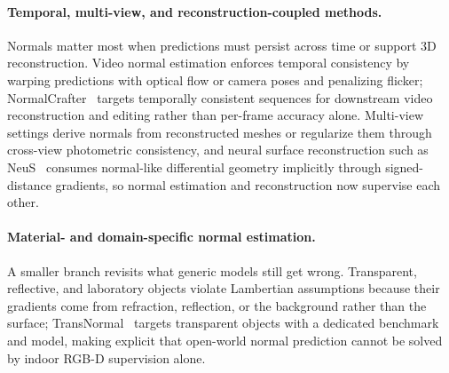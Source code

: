 \paragraph{Temporal, multi-view, and reconstruction-coupled methods.}
Normals matter most when predictions must persist across time or support 3D reconstruction.
Video normal estimation enforces temporal consistency by warping predictions with optical flow or camera poses and penalizing flicker; NormalCrafter~\cite{wang2025normalcrafter} targets temporally consistent sequences for downstream video reconstruction and editing rather than per-frame accuracy alone.
Multi-view settings derive normals from reconstructed meshes or regularize them through cross-view photometric consistency, and neural surface reconstruction such as NeuS~\cite{wang2021neus} consumes normal-like differential geometry implicitly through signed-distance gradients, so normal estimation and reconstruction now supervise each other.

\paragraph{Material- and domain-specific normal estimation.}
A smaller branch revisits what generic models still get wrong.
Transparent, reflective, and laboratory objects violate Lambertian assumptions because their gradients come from refraction, reflection, or the background rather than the surface; TransNormal~\cite{li2026transnormal} targets transparent objects with a dedicated benchmark and model, making explicit that open-world normal prediction cannot be solved by indoor RGB-D supervision alone.



